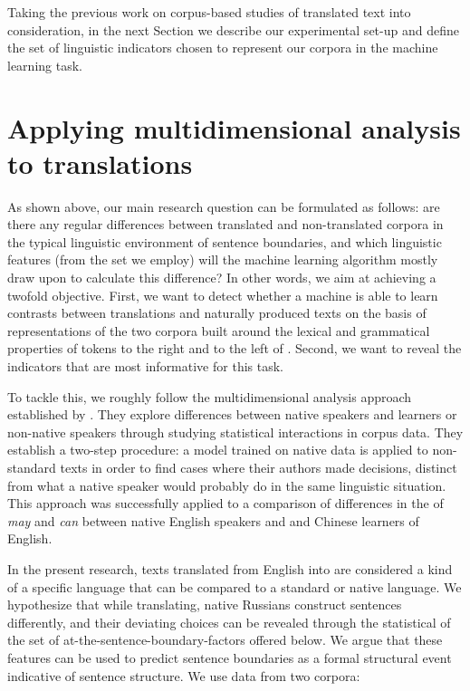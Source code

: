 \documentclass[output=paper]{langsci/langscibook.cls}
\begin{document}
Taking the previous work on corpus-based studies of translated text into consideration, in the next Section we describe our experimental set-up and define the set of linguistic indicators chosen to represent our corpora in the machine learning task. 

\section{Applying multidimensional analysis to translations}\label{sec:andrey:mda}

As shown above, our main research question can be formulated as follows: are there any regular differences between translated and non-translated corpora in the typical linguistic environment of sentence boundaries, and which linguistic features (from the set we employ) will the machine learning algorithm mostly draw upon to calculate this difference? In other words, we aim at achieving a twofold objective. First, we want to detect whether a machine is able to learn contrasts between translations and naturally produced texts on the basis of representations of the two corpora built around the lexical and grammatical properties of tokens to the right and to the left of . Second, we want to reveal the indicators that are most informative for this task.

To tackle this, we roughly follow the multidimensional analysis approach established by \citet{Gries:2014}. They explore differences between native speakers and learners or non-native speakers through studying statistical interactions in corpus data. They establish a two-step procedure: a model trained on native data is applied to non-standard texts in order to find cases where their authors made decisions, distinct from what a native speaker would probably do in the same linguistic situation. This approach was successfully applied to a comparison of differences in the  of \textit{may} and \textit{can} between native English speakers and  and Chinese learners of English. 

In the present research, texts translated from English into  are considered a kind of a specific  language  that can be compared to a standard or native language. We hypothesize that while translating, native Russians construct sentences differently, and their deviating choices can be revealed through the statistical  of the set of at-the-sentence-boundary-factors offered below. We argue that these features can be used to predict sentence boundaries as a formal structural event indicative of sentence structure. We use data from two corpora: 
\end{document}
